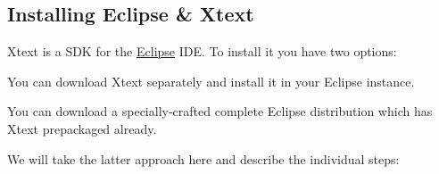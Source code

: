 \subsection{Installing Eclipse & Xtext}

Xtext is a SDK for the \href{http://www.eclipse.org/}{Eclipse} IDE. To
install it you have two options:

\begin{compactitem}
    \item You can download Xtext separately and install it in your Eclipse
    instance.
    \item You can download a specially-crafted complete Eclipse distribution
    which has Xtext prepackaged already.
\end{compactitem}

We will take the latter approach here and describe the individual steps:

